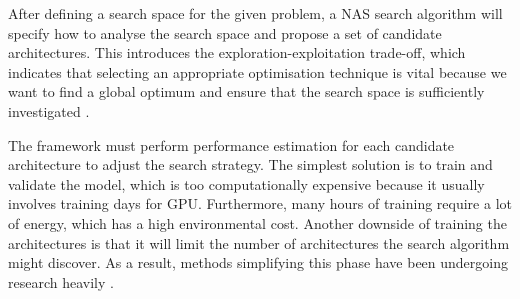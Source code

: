 After defining a search space for the given problem, a NAS search algorithm will specify how to analyse the search space and propose a set of candidate architectures. This introduces the exploration-exploitation trade-off, which indicates that selecting an appropriate optimisation technique is vital because we want to find a global optimum and ensure that the search space is sufficiently investigated \autocite{kyriakides2020introduction}. 

The framework must perform performance estimation for each candidate architecture to adjust the search strategy. The simplest solution is to train and validate the model, which is too computationally expensive because it usually involves training days for \gls{GPU}. Furthermore, many hours of training require a lot of energy, which has a high environmental cost. Another downside of training the architectures is that it will limit the number of architectures the search algorithm might discover. As a result, methods simplifying this phase have been undergoing research heavily \autocite{elsken2019neural}. 




